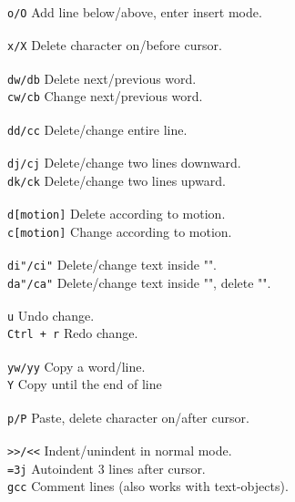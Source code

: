 \documentclass[10pt,landscape]{article}
\begin{document}
\begin{multicols}{3}
\verb!o/O! \hfill Add line below/above, enter insert mode.\\
\verb! ! \\
\verb!x/X! \hfill Delete character on/before cursor.\\
\verb! !\\
\verb!dw/db! \hfill Delete next/previous word.\\
\verb!cw/cb! \hfill Change next/previous word.\\
\verb! !\\
\verb!dd/cc! \hfill Delete/change entire line.\\
\verb! !\\
\verb!dj/cj! \hfill Delete/change two lines downward.\\
\verb!dk/ck! \hfill Delete/change two lines upward.\\
\verb! !\\
\verb!d[motion]! \hfill Delete according to motion.\\
\verb!c[motion]! \hfill Change according to motion.\\
\verb! !\\
\verb!di"/ci"! \hfill Delete/change text inside "".\\
\verb!da"/ca"! \hfill Delete/change text inside "", delete "".\\
\verb! ! \\
\verb!u! \hfill Undo change.\\
\verb!Ctrl + r! \hfill Redo change.\\
\verb! !\\
\verb!yw/yy! \hfill Copy a word/line.\\
\verb!Y! \hfill Copy until the end of line \\
\verb! ! \\
\verb!p/P! \hfill Paste, delete character on/after cursor.\\
\verb! !\\
\verb!>>/<<! \hfill Indent/unindent in normal mode.\\
\verb!=3j! \hfill Autoindent 3 lines after cursor.\\
\verb!gcc! \hfill Comment lines (also works with text-objects).\\

\verb! !\\
\verb! !\\
\verb! !\\
\verb! !\\
\verb! !\\


\end{multicols}
\end{document}
